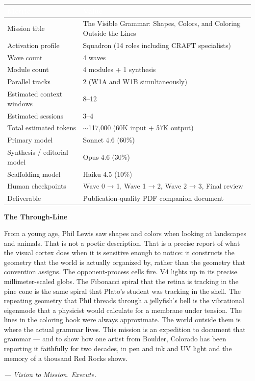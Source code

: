 \documentclass[11pt,letterpaper]{article}
\newcommand{\tableheader}[1]{\textbf{\sffamily\textcolor{white}{#1}}}
\begin{document}
\begin{center}
\begin{tabularx}{\textwidth}{L{4cm}X}
\toprule
{}
\tableheader{Metric} & \tableheader{Value} \\
\midrule
Mission title & The Visible Grammar: Shapes, Colors, and Coloring Outside the Lines \\
Activation profile & Squadron (14 roles including CRAFT specialists) \\
Wave count & 4 waves \\
Module count & 4 modules + 1 synthesis \\
Parallel tracks & 2 (W1A and W1B simultaneously) \\
Estimated context windows & 8--12 \\
Estimated sessions & 3--4 \\
Total estimated tokens & $\sim$117,000 (60K input + 57K output) \\
Primary model & Sonnet 4.6 (60\%) \\
Synthesis / editorial model & Opus 4.6 (30\%) \\
Scaffolding model & Haiku 4.5 (10\%) \\
Human checkpoints & Wave 0 → 1, Wave 1 → 2, Wave 2 → 3, Final review \\
Deliverable & Publication-quality PDF companion document \\
\bottomrule
\end{tabularx}
\end{center}

\vspace{2em}

\begin{quotebox}
\textbf{\sffamily The Through-Line}

\medskip

From a young age, Phil Lewis saw shapes and colors when looking at landscapes and animals. That is not a poetic description. That is a precise report of what the visual cortex does when it is sensitive enough to notice: it constructs the geometry that the world is actually organized by, rather than the geometry that convention assigns. The opponent-process cells fire. V4 lights up in its precise millimeter-scaled globs. The Fibonacci spiral that the retina is tracking in the pine cone is the same spiral that Plato's student was tracking in the shell. The repeating geometry that Phil threads through a jellyfish's bell is the vibrational eigenmode that a physicist would calculate for a membrane under tension. The lines in the coloring book were always approximate. The world outside them is where the actual grammar lives. This mission is an expedition to document that grammar --- and to show how one artist from Boulder, Colorado has been reporting it faithfully for two decades, in pen and ink and UV light and the memory of a thousand Red Rocks shows.

\medskip
\textit{--- Vision to Mission. Execute.}
\end{quotebox}
\end{document}
